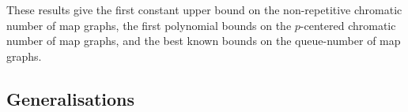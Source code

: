 \documentclass{patmorin}
\theoremstyle{plain}
\newtheorem{thm}{Theorem}
\newtheorem{cor}[thm]{Corollary}
\theoremstyle{definition}
\newcommand{\note}[2]{\noindent{\color{red}[#1:~#2]}}
\renewcommand{\geq}{\geqslant}
\renewcommand{\leq}{\leqslant}
\begin{document}
These results give the first constant upper bound on the non-repetitive chromatic number of map graphs, the first polynomial bounds on the $p$-centered chromatic number of map graphs, and the best known bounds on the queue-number of map graphs.



% 
% 
% 




\subsection{Generalisations}
\label{Generalisations}

%
\end{document}
